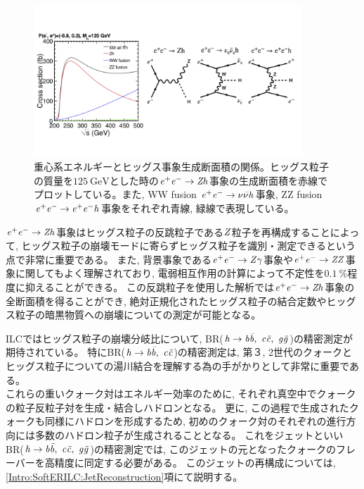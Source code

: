 \begin{figure}[htbp]
 \centering
 \includegraphics[trim= 0 50 0 50, width=0.9\textwidth, clip]{Figure/1Introduction/4eetoZH.png}
 \caption[重心系エネルギーとヒッグス事象生成断面積の関係]{重心系エネルギーとヒッグス事象生成断面積の関係\cite{ILCTDRVP}。ヒッグス粒子の質量を$125\ \mathrm{GeV}$とした時の$\it e^+e^- \to Zh$事象の生成断面積を赤線でプロットしている。また, WW fusion $\it e^+e^- \to \nu \bar{\nu} h$事象, ZZ fusion $\it e^+e^- \to e^+ e^- h$事象をそれぞれ青線, 緑線で表現している。}
 \label{4eetoZH}
\end{figure}

$\it e^+e^- \to Zh$事象はヒッグス粒子の反跳粒子である$\it Z$粒子を再構成することによって, ヒッグス粒子の崩壊モードに寄らずヒッグス粒子を識別・測定できるという点で非常に重要である。
また, 背景事象である$\it e^+e^- \to Z\gamma$事象や$\it e^+e^- \to ZZ$事象に関してもよく理解されており, 電弱相互作用の計算によって不定性を$0.1\ \%$程度に抑えることができる\cite{GlobalProject}。
この反跳粒子を使用した解析では$\it e^+e^- \to Zh$事象の全断面積を得ることができ, 絶対正規化されたヒッグス粒子の結合定数やヒッグス粒子の暗黒物質への崩壊についての測定が可能となる。

ILCではヒッグス粒子の崩壊分岐比について, BR($\it h \to b \bar{b},\ c \bar{c},\ g \bar{g}$)の精密測定が期待されている。
特にBR($\it h \to b \bar{b},\ c \bar{c}$)の精密測定は, 第３, 2世代のクォークとヒッグス粒子についての湯川結合を理解する為の手がかりとして非常に重要である。\\

\newpage
これらの重いクォーク対はエネルギー効率のために, それぞれ真空中でクォークの粒子反粒子対を生成・結合しハドロンとなる。
更に, この過程で生成されたクォークも同様にハドロンを形成するため, 初めのクォーク対のそれぞれの進行方向には多数のハドロン粒子が生成されることとなる。
これをジェットといいBR($\it h \to b \bar{b},\ c \bar{c},\ g \bar{g}$)の精密測定では, このジェットの元となったクォークのフレーバーを高精度に同定する必要がある。
このジェットの再構成については, \ref{Intro:SoftERILC:JetReconstruction}項にて説明する。


